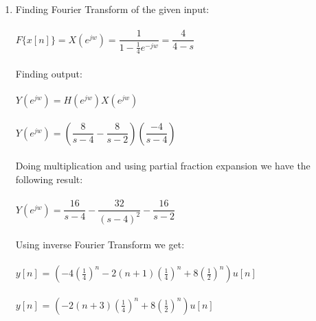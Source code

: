 \documentclass[10pt,a4paper, margin=1in]{article}
\begin{document}
\begin{enumerate}
\begin{enumerate}
    \item Finding Fourier Transform of the given input: \\
    \\
    $F\{x[n]\} = X(e^{jw}) = \dfrac{1}{1 - \frac{1}{4}e^{-jw}} = \dfrac{4}{4 - s}$ \\
    \\
    Finding output: \\
    \\
    $Y(e^{jw}) = H(e^{jw}) X(e^{jw})$ \\
    \\
    $Y(e^{jw}) = \left(\dfrac{8}{s-4} - \dfrac{8}{s-2}\right) \left( \dfrac{-4}{s-4} \right)$ \\
    \\
    Doing multiplication and using partial fraction expansion we have the following result: \\
    \\
    $Y(e^{jw}) = \dfrac{16}{s-4} - \dfrac{32}{(s-4)^2} - \dfrac{16}{s-2}$ \\
    \\
    Using inverse Fourier Transform we get: \\
    \\
    $y[n]$ = $\left( -4(\frac{1}{4})^n - 2(n + 1)(\frac{1}{4})^n + 8(\frac{1}{2})^n \right)u[n]$ \\
    \\
    $y[n]$ = $\left( -2(n + 3)(\frac{1}{4})^n + 8(\frac{1}{2})^n \right)u[n]$ \\    
    \end{enumerate}



\end{enumerate}
\end{document}
